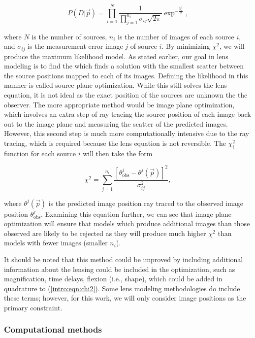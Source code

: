 \begin{equation}
P(D | \vec{p} ) = \prod_{i=1}^N \frac{1}{  \prod_{j=1}^{n_i} \sigma_{ij} \sqrt{2\pi} } \exp^{-\frac{\chi_i^2}{2}},
\label{intro:eqn:likelihood}
\end{equation}

\noindent where $N$ is the number of sources, $n_i$ is the number of images of each source $i$, and $\sigma_{ij}$ is the measurement error image $j$ of source $i$. By minimizing $\chi^2$, we will produce the maximum likelihood model. As stated earlier, our goal in lens modeling is to find the which finds a solution with the smallest scatter between the source positions mapped to each of its images. Defining the likelihood in this manner is called source plane optimization. While this still solves the lens equation, it is not ideal as the exact position of the sources are unknown the the observer. The more appropriate method would be image plane optimization, which involves an extra step of ray tracing the source position of each image back out to the image plane and measuring the scatter of the predicted images. However, this second step is much more computationally intensive due to the ray tracing, which is required because the lens equation is not reversible. The $\chi_i^2$ function for each source $i$ will then take the form

\begin{equation}
\chi^2 = \sum_{j=1}^{n_i} \frac{[\theta_\mathrm{obs}^j - \theta^j (\vec{p})]^2}{\sigma_{ij}^2},
\label{intro:eqn:chi2}
\end{equation}

\noindent where $\theta^j (\vec{p})$ is the predicted image position ray traced to the observed image position $\theta_\mathrm{obs}^j$. Examining this equation further, we can see that image plane optimization will ensure that models which produce additional images than those observed are likely to be rejected as they will produce much higher $\chi^2$ than models with fewer images (smaller $n_i$).

It should be noted that this method could be improved by including additional information about the lensing could be included in the optimization, such as magnification, time delays, flexion (i.e., shape), which could be added in quadrature to (\ref{intro:eqn:chi2}). Some lens modeling methodologies do include these terms; however, for this work, we will only consider image positions as the primary constraint.

\subsubsection{Computational methods}

